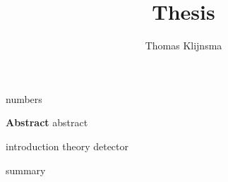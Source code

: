\documentclass[draftmode]{main}
\begin{document}
\title{Thesis}
\author{Thomas Klijnsma}
\maketitle

{numbers}

\textbf{Abstract}
{abstract}

\tableofcontents

{introduction}
{theory}
{detector}


{summary}




\end{document}
